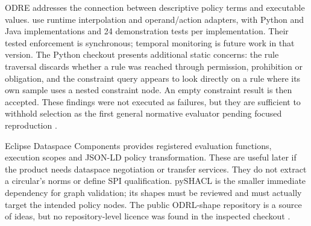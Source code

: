ODRE addresses the connection between descriptive policy terms and executable
values. \citet{odre2024} use runtime interpolation and operand/action adapters,
with Python and Java implementations and 24 demonstration tests per
implementation. Their tested enforcement is synchronous; temporal monitoring
is future work in that version. The Python checkout presents additional static
concerns: the rule traversal discards whether a rule was reached through
permission, prohibition or obligation, and the constraint query appears to
look directly on a rule where its own sample uses a nested constraint node.
An empty constraint result is then accepted. These findings were not executed
as failures, but they are sufficient to withhold selection as the first general
normative evaluator pending focused reproduction
\citep{odre2024,hkmaodrlsoftware2026}.

Eclipse Dataspace Components provides registered evaluation functions,
execution scopes and JSON-LD policy transformation. These are useful later
if the product needs dataspace negotiation or transfer services. They do not
extract a circular's norms or define SPI qualification. pySHACL is the smaller
immediate dependency for graph validation; its shapes must be reviewed and
must actually target the intended policy nodes. The public ODRL-shape
repository is a source of ideas, but no repository-level licence was found
in the inspected checkout \citep{hkmaodrlsoftware2026}.


